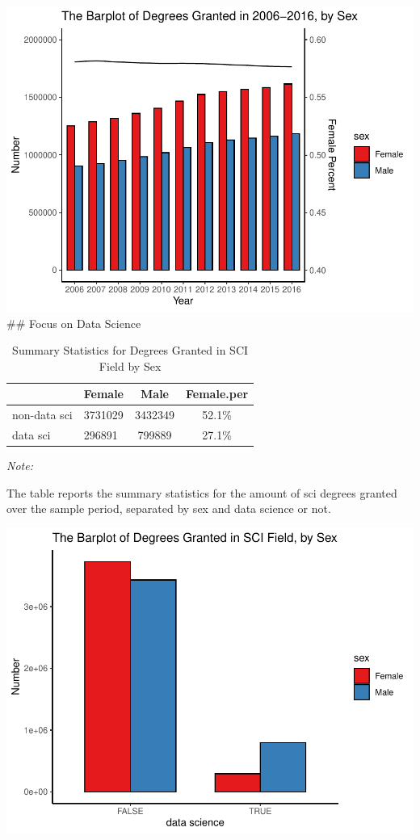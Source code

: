 \documentclass[
  12pt,
]{article}
\begin{document}
\includegraphics{hw1_sol_files/figure-latex/unnamed-chunk-11-1.pdf} \#\#
Focus on Data Science

\begin{table}[H]

\caption{\label{tab:unnamed-chunk-12}Summary Statistics for Degrees Granted in SCI Field by Sex}
\centering
\begin{threeparttable}
\begin{tabular}[t]{llcc}
\toprule
  & Female & Male & Female.per\\
\midrule
non-data sci & 3731029 & 3432349 & 52.1\%\\
data sci & 296891 & 799889 & 27.1\%\\
\bottomrule
\end{tabular}
\begin{tablenotes}
\item \textit{Note: } 
\item The table reports the summary statistics for the amount of sci degrees granted over the sample period, separated by sex and data science or not.
\end{tablenotes}
\end{threeparttable}
\end{table}

\includegraphics{hw1_sol_files/figure-latex/unnamed-chunk-12-1.pdf}
\end{document}

